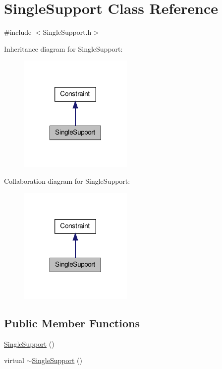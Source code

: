 \hypertarget{classSingleSupport}{\section{\-Single\-Support \-Class \-Reference}
\label{classSingleSupport}
}


{\ttfamily \#include $<$\-Single\-Support.\-h$>$}



\-Inheritance diagram for \-Single\-Support\-:
\nopagebreak
\begin{figure}[H]
\begin{center}
\leavevmode
\includegraphics[width=156pt]{classSingleSupport__inherit__graph}
\end{center}
\end{figure}


\-Collaboration diagram for \-Single\-Support\-:
\nopagebreak
\begin{figure}[H]
\begin{center}
\leavevmode
\includegraphics[width=156pt]{classSingleSupport__coll__graph}
\end{center}
\end{figure}
\subsection*{\-Public \-Member \-Functions}
\begin{DoxyCompactItemize}
\item 
\hyperlink{classSingleSupport_af952e77f8d2139224fc0af9b73a6a0d1}{\-Single\-Support} ()
\item 
virtual \hyperlink{classSingleSupport_a56ad004d201bf57cb3472477857b5b38}{$\sim$\-Single\-Support} ()
\end{DoxyCompactItemize}
